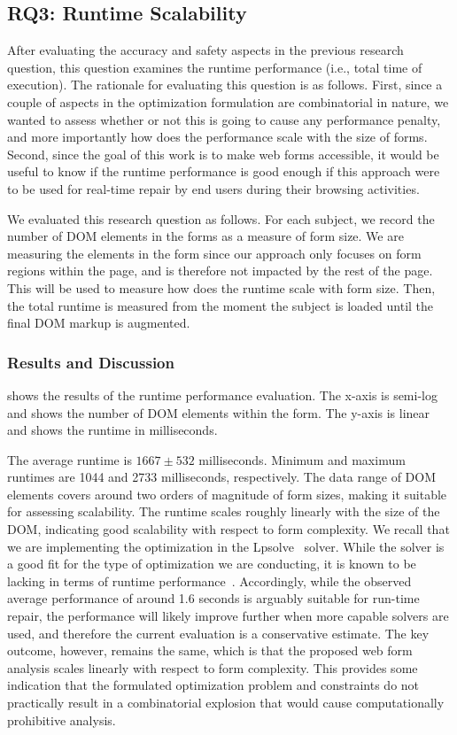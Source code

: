     

\subsection{RQ3: Runtime Scalability}\label{subsec:rq3}
After evaluating the accuracy and safety aspects in the previous 
research question, this question examines the runtime performance (i.e., 
total time of execution). 
The rationale for evaluating this question is as follows. 
First, since a couple of aspects in the optimization formulation 
are combinatorial in nature, we wanted to assess whether or not this 
is going to cause any performance penalty, and more importantly how does 
the performance scale with the size of forms. 
Second, since the goal of this work is to make web forms accessible, 
it would be useful to know if the runtime performance is good enough 
if this approach were to be used for real-time repair by end users 
during their browsing activities. 

We evaluated this research question as follows. 
For each subject, we record the number of DOM elements in the forms 
as a measure of form size. We are measuring the elements in the form 
since our approach only focuses on form regions within the page, 
and is therefore not impacted by the rest of the page.
This will be used to measure how does the runtime scale with form size. 
Then, the total runtime is measured from the moment the subject is loaded 
until the final DOM markup is augmented. 

\subsubsection{Results and Discussion}
 shows the results of the runtime performance evaluation. 
The x-axis is semi-log and shows the number of DOM elements within 
the form. The y-axis is linear and shows the runtime in milliseconds. 

The average runtime is $1667 \pm 532$ milliseconds. Minimum and 
maximum runtimes are 1044 and 2733 milliseconds, respectively. 
The data range of DOM elements covers around two orders of magnitude 
of form sizes, making it suitable for assessing scalability.
The runtime scales roughly linearly with the size of the DOM, 
indicating good scalability with respect to form complexity.  
We recall that we are implementing the optimization in the Lpsolve~\cite{lpsolve} 
solver. While the solver is a good fit for the type of optimization 
we are conducting, it is known to be lacking in terms of runtime 
performance~\cite{luppold2018evaluating}. Accordingly, while the 
observed average performance of around 1.6 seconds is arguably 
suitable for run-time repair, the performance will likely improve 
further when more capable solvers are used, and therefore the 
current evaluation is a conservative estimate. The key outcome, 
however, remains the same, which is that the proposed web form 
analysis scales linearly with respect to form complexity. This 
provides some indication that the formulated optimization problem 
and constraints do not practically result in a combinatorial 
explosion that would cause computationally prohibitive analysis.   

